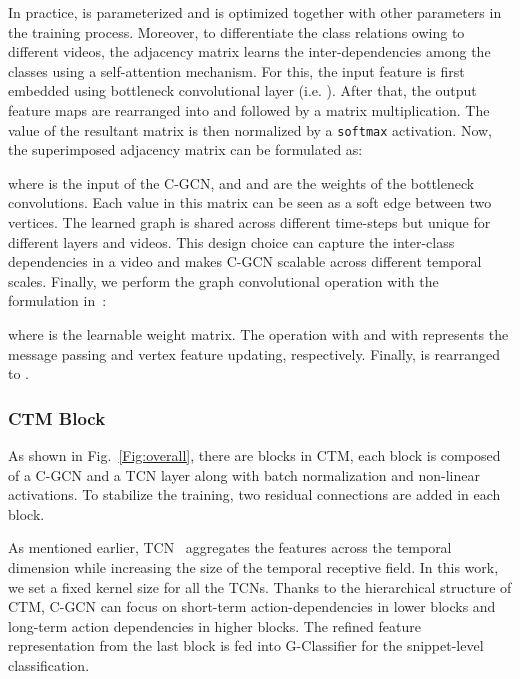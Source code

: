 \documentclass{bmvc2k}
\begin{document}
In practice,  is parameterized and is optimized together with other parameters in the training process. 
Moreover, to differentiate the class relations owing to different videos, the adjacency matrix  learns the inter-dependencies among the classes using a self-attention mechanism. 
For this, the input feature  is first embedded using bottleneck convolutional layer (i.e. ). 
After that, the output feature maps are rearranged into  and  followed by a matrix multiplication. The value of the resultant matrix is then normalized by a \texttt{softmax} activation. Now, the superimposed adjacency matrix  can be formulated as:

where  is the input of the C-GCN, and  and  are the weights of the bottleneck convolutions. 
Each value in this matrix can be seen as a soft edge between two vertices.
The learned graph is shared across different time-steps but unique for different layers and videos. This design choice can capture the inter-class dependencies in a video and makes C-GCN scalable across different temporal scales. 
Finally, we perform the graph convolutional operation with the formulation in~\cite{kipf2016semi}:

{where  is the learnable weight matrix.} The operation with  and with  represents the message passing and vertex feature updating, respectively. Finally,  is rearranged to .

\subsubsection{CTM Block}
As shown in Fig.~\ref{Fig:overall}, there are  blocks in CTM, each block is composed of a C-GCN and a TCN layer along with batch normalization and non-linear activations. 
To stabilize the training, two residual connections are added in each block. 

As mentioned earlier, TCN~\cite{lea2017temporal} aggregates the features across the temporal dimension while increasing the size of the temporal receptive field. 
In this work, we set a fixed kernel size  for all the TCNs. 
Thanks to the hierarchical structure of CTM, C-GCN can focus on short-term action-dependencies in lower blocks and long-term action dependencies in higher blocks. 
The refined feature representation from the last block is fed into G-Classifier for the snippet-level classification. 


\iffalse
\end{document}
